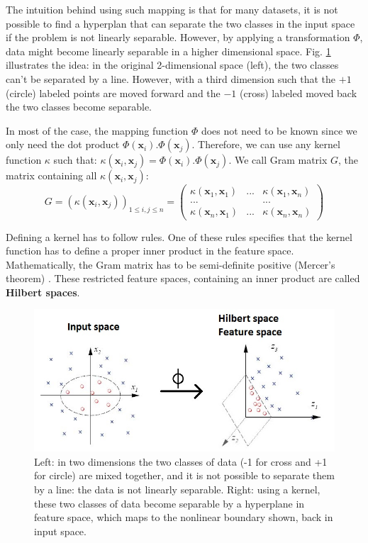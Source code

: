 The intuition behind using such mapping is that for many datasets, it is not possible to find a hyperplan that can separate the two classes in the input space if the problem is not linearly separable. However, by applying a transformation $\Phi$, data might become linearly separable in a higher dimensional space. Fig. \ref{fig:SVM_nonlinear} illustrates the idea: in the original 2-dimensional space (left), the two classes can't be separated by a line. However, with a third dimension such that the $+1$ (circle) labeled points are moved forward and the $-1$ (cross) labeled moved back the two classes become separable.

In most of the case, the mapping function $\Phi$ does not need to be known since we only need the dot product $\Phi(\textbf{x}_i) . \Phi(\textbf{x}_j)$. Therefore, we can use any kernel function $\kappa$ such that: $\kappa(\textbf{x}_i,\textbf{x}_j)= \Phi(\textbf{x}_i) . \Phi(\textbf{x}_j)$. We call Gram matrix $G$, the matrix containing all $\kappa(\textbf{x}_i,\textbf{x}_j)$:
\begin{equation*}
	G = (\kappa(\textbf{x}_i,\textbf{x}_j))_{1 \leq i,j \leq n} = 
	\begin{pmatrix}
	\kappa(\textbf{x}_1,\textbf{x}_1) & ... & \kappa(\textbf{x}_1,\textbf{x}_n) \\
	... & & ... \\
	\kappa(\textbf{x}_n,\textbf{x}_1) & ... & \kappa(\textbf{x}_n,\textbf{x}_n) 
	\end{pmatrix}
\end{equation*}

\noindent Defining a kernel has to follow rules. One of these rules specifies that the kernel function has to define a proper inner product in the feature space. Mathematically, the Gram matrix has to be semi-definite positive (Mercer's theorem) \cite{Schlkopf2013}. These restricted feature spaces, containing an inner product are called \textbf{Hilbert spaces}.


\begin{figure}[h!]
\centering
\includegraphics[width=0.9\linewidth]{images/SVM_nonlinear2}
\caption[Illustration of the use of kernels]{Left: in two dimensions the two classes of data (-1 for cross and +1 for circle) are mixed together, and it is not possible to separate them by a line: the data is not linearly separable. Right: using a kernel, these two classes of data become separable by a hyperplane in feature space, which maps to the nonlinear boundary shown, back in input space.\protect\footnotemark}
\label{fig:SVM_nonlinear}
\end{figure}

